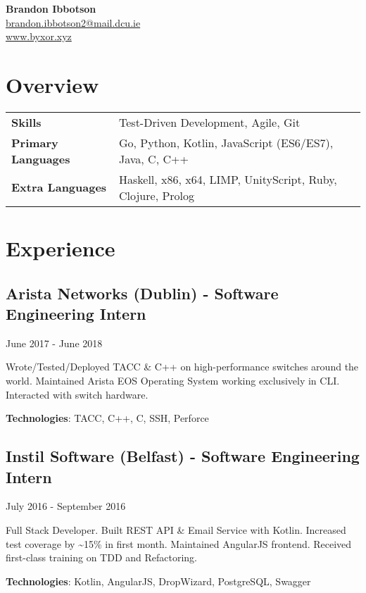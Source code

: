 \documentclass{article}
\newcommand{\youremail}[1]{\href{mailto:#1}{#1}}
\newcommand{\yourtitle}[3]{
  \begin{center}
    {\huge\bfseries #1}\\
    \vspace{.5em}
    \youremail{#2}\\
    \url{#3}\\
    \vspace{.7em}
  \end{center}
}
\begin{document}
\yourtitle{Brandon Ibbotson}{brandon.ibbotson2@mail.dcu.ie}{www.byxor.xyz}
\section{Overview}
\begin{tabularx}{\textwidth}{ll}
\vspace{0.75em}
\textbf{Skills} & Test-Driven Development, Agile, Git\\
\vspace{0.75em}
\textbf{Primary Languages} & Go, Python, Kotlin, JavaScript (ES6/ES7), Java, C, C++\\
\textbf{Extra Languages} & Haskell, x86, x64, LIMP, UnityScript, Ruby, Clojure, Prolog\\
\end{tabularx}
\section{Experience}
\subsection{Arista Networks (Dublin) - Software Engineering Intern}
June 2017 - June 2018

Wrote/Tested/Deployed TACC \& C++ on high-performance switches around the world. Maintained Arista EOS Operating System working exclusively in CLI. Interacted with switch hardware.

\textbf{Technologies}: TACC, C++, C, SSH, Perforce
\vspace{0.5em}
\subsection{Instil Software (Belfast) - Software Engineering Intern}
July 2016 - September 2016

Full Stack Developer. Built REST API \& Email Service with Kotlin. Increased test coverage by \textasciitilde{}15\% in first month. Maintained AngularJS frontend. Received first-class training on TDD and Refactoring.

\textbf{Technologies}: Kotlin, AngularJS, DropWizard, PostgreSQL, Swagger
\vspace{0.5em}
\end{document}
